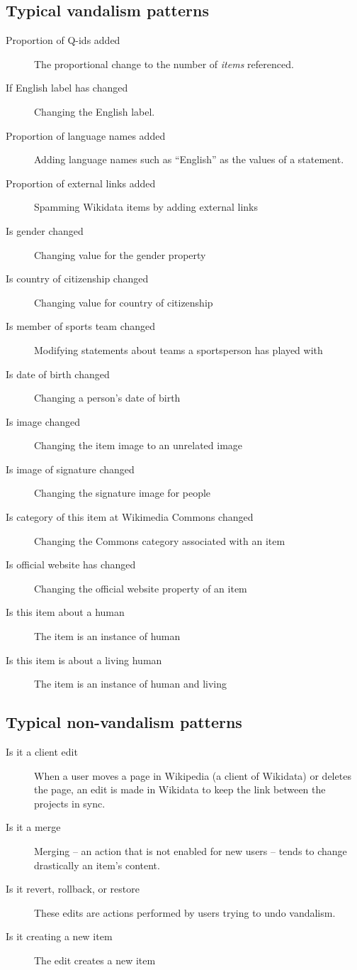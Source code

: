 \documentclass{sig-alternate-2013}
\begin{document}
\subsection{Typical vandalism patterns}
\begin{description}
\item[Proportion of Q-ids added] The proportional change to the number of \textit{items} referenced.
\item[If English label has changed] Changing the English label.
\item[Proportion of language names added]  Adding language names such as ``English'' as the values of a statement.
\item[Proportion of external links added]  Spamming Wikidata items by adding external links
\item[Is gender changed] Changing value for the gender property
\item[Is country of citizenship changed]  Changing value for country of citizenship
\item[Is member of sports team changed] Modifying statements about teams a sportsperson has played with
\item[Is date of birth changed]  Changing a person's date of birth
\item[Is image changed]  Changing the item image to an unrelated image
\item[Is image of signature changed]  Changing the signature image for people
\item[Is category of this item at Wikimedia Commons changed]  Changing the Commons category associated with an item
\item[Is official website has changed]  Changing the official website property of an item
\item[Is this item about a human]  The item is an instance of human
\item[Is this item is about a living human]  The item is an instance of human and living
\end{description}
\subsection{Typical non-vandalism patterns}
\begin{description}
\item[Is it a client edit] When a user moves a page in Wikipedia (a client of Wikidata) or deletes the page, an edit is made in Wikidata to keep the link between the projects in sync.
\item[Is it a merge] Merging -- an action that is not enabled for new users -- tends to change drastically an item's content.
\item[Is it revert, rollback, or restore] These edits are actions performed by users trying to undo vandalism.
\item[Is it creating a new item] The edit creates a new item
\end{description}
\end{document}
